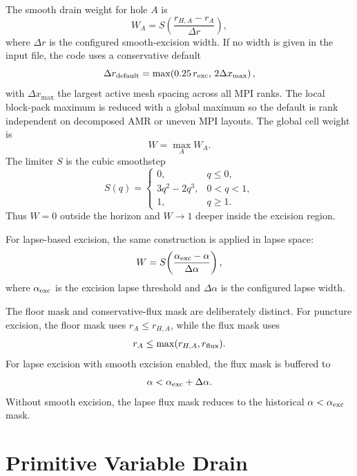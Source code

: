 \documentclass[11pt]{article}
\begin{document}
The smooth drain weight for hole \(A\) is
\begin{equation}
  W_A = S\!\left(\frac{r_{H,A}-r_A}{\Delta r}\right),
\end{equation}
where \(\Delta r\) is the configured smooth-excision width.  If no width is
given in the input file, the code uses a conservative default
\begin{equation}
  \Delta r_{\rm default}
  =
  \max\!\left(0.25\,r_{\rm exc},\,2\Delta x_{\max}\right),
\end{equation}
with \(\Delta x_{\max}\) the largest active mesh spacing across all MPI
ranks.  The local block-pack maximum is reduced with a global maximum so the
default is rank independent on decomposed AMR or uneven MPI layouts.
The global cell weight is
\begin{equation}
  W = \max_A W_A .
\end{equation}
The limiter \(S\) is the cubic smoothstep
\begin{equation}
  S(q) =
  \begin{cases}
    0, & q \leq 0,\\
    3q^2 - 2q^3, & 0 < q < 1,\\
    1, & q \geq 1.
  \end{cases}
\end{equation}
Thus \(W=0\) outside the horizon and \(W\to 1\) deeper inside the excision
region.

For lapse-based excision, the same construction is applied in lapse space:
\begin{equation}
  W = S\!\left(\frac{\alpha_{\rm exc} - \alpha}{\Delta \alpha}\right),
\end{equation}
where \(\alpha_{\rm exc}\) is the excision lapse threshold and
\(\Delta \alpha\) is the configured lapse width.

The floor mask and conservative-flux mask are deliberately distinct.  For
puncture excision, the floor mask uses \(r_A \le r_{H,A}\), while the flux
mask uses
\begin{equation}
  r_A \le \max(r_{H,A}, r_{\rm flux}).
\end{equation}
For lapse excision with smooth excision enabled, the flux mask is buffered to
\begin{equation}
  \alpha < \alpha_{\rm exc} + \Delta\alpha .
\end{equation}
Without smooth excision, the lapse flux mask reduces to the historical
\(\alpha < \alpha_{\rm exc}\) mask.

\section{Primitive Variable Drain}
\end{document}
